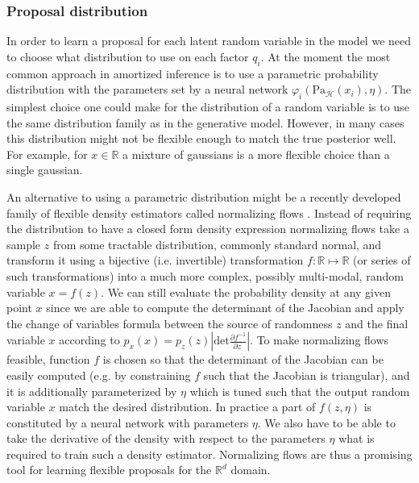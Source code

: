 \documentclass[12pt]{article}
\begin{document}




\subsubsection*{Proposal distribution}

In order to learn a proposal for each latent random variable in the model we need to choose what distribution to use on each factor $q_i$.
At the moment the most common approach in amortized inference is to use a parametric probability distribution with the parameters set by a neural network $\varphi_i(\text{Pa}_\mathcal{H}(x_i), \eta)$.
The simplest choice one could make for the distribution of a random variable is to use the same distribution family as in the generative model.
However, in many cases this distribution might not be flexible enough to match the true posterior well.
For example, for $x \in \mathbb{R}$ a mixture of gaussians is a more flexible choice than a single gaussian.


An alternative to using a parametric distribution might be a recently developed family of flexible density estimators called normalizing flows \citep{RezendeMohamed2015,IAF,MAF}.
Instead of requiring the distribution to have a closed form density expression normalizing flows take a sample $z$ from some tractable distribution, commonly standard normal, and transform it using a bijective (i.e. invertible) transformation $f: \mathbb{R} \mapsto \mathbb{R}$ (or series of such transformations) into a much more complex, possibly multi-modal, random variable $x=f(z)$.
We can still evaluate the probability density at any given point $x$ since we are able to compute the determinant of the Jacobian and apply the change of variables formula between the source of randomness $z$ and the final variable $x$ according to 
$p_x(x) = p_z(z) \left|
    \mathrm{det} \frac{
      \partial f^{-1}
    }{
      \partial z\
    }
  \right|$.
To make normalizing flows feasible, function $f$ is chosen so that the determinant of the Jacobian can be easily computed (e.g. by constraining $f$ such that the Jacobian is triangular), and it is additionally parameterized by $\eta$ which is tuned such that the output random variable $x$ match the desired distribution. In practice a part of $f(z, \eta)$ is constituted by a neural network with parameters $\eta$.
We also have to be able to take the derivative of the density with respect to the parameters $\eta$ what is required to train such a density estimator.
Normalizing flows are thus a promising tool for learning flexible proposals for the $\mathbb{R}^d$ domain.
\end{document}
